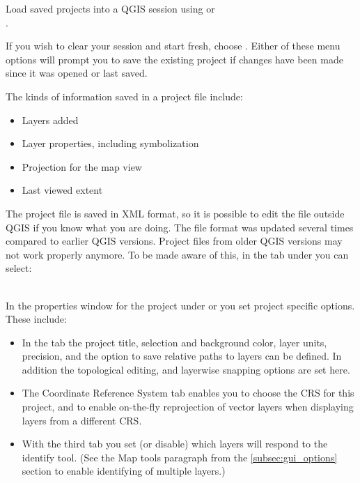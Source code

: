 Load saved projects into a QGIS session using
 \arrow {}
or  \arrow \\
.

If you wish to clear your session and start fresh, choose
 \arrow {}.
Either of these menu options will prompt you to save the existing project
if changes have been made since it was opened or last saved.

The kinds of information saved in a project file include:

\begin{itemize}
\item Layers added
\item Layer properties, including symbolization
\item Projection for the map view
\item Last viewed extent
\end{itemize}

The project file is saved in XML format, so it is possible to edit
the file outside QGIS if you know what you are doing. The file format
was updated several times compared to earlier QGIS versions. Project files
from older QGIS versions may not work properly anymore. To be made aware of this,
in the  tab under  \arrow {}
you can select: \\

 \\

In the properties window for the project under  or  you set project specific options. These
include:

\begin{itemize}
\item In the  tab the project title, selection and background
color, layer units, precision, and the option to save relative paths to
layers can be defined. In addition the topological editing, and layerwise
snapping options are set here.
\item The  Coordinate Reference System tab enables you to choose the
CRS for this project, and to enable on-the-fly reprojection of vector layers
when displaying layers from a different CRS.
\item With the third  tab you set (or disable) which
layers will respond to the identify tool. (See the Map tools paragraph from
the \ref{subsec:gui_options} section to enable identifying of multiple layers.)
\end{itemize}

